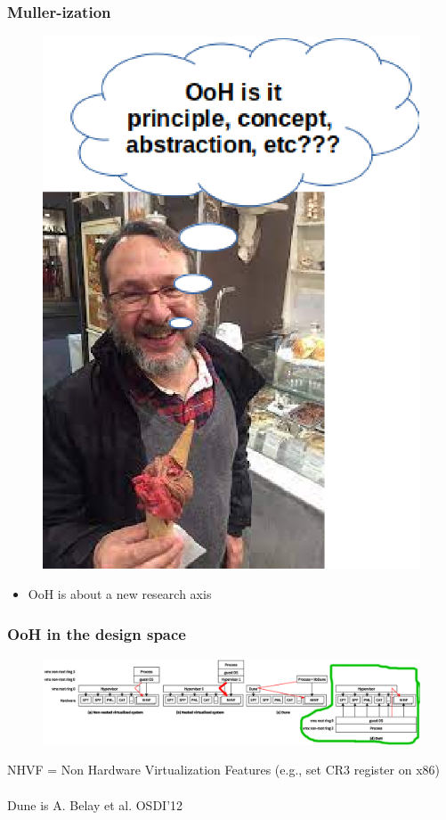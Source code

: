 \documentclass[xcolor=table,bigger,unknownkeysallowed]{beamer}
\begin{document}
        \begin{frame}
        \frametitle{Muller-ization} 
 		    \begin{figure}
			\centering
	\includegraphics[width=.2\columnwidth]{fig/mullerization}
			\end{figure}         
				\begin{itemize}
					\item \huge OoH is about a new research axis
				\end{itemize}
        \end{frame}               
        \begin{frame}
        \frametitle{OoH in the design space} 
 		    \begin{figure}
			\centering
	\includegraphics[width=1\columnwidth]{fig/differences}
			\end{figure} 
			\scriptsize NHVF = Non Hardware Virtualization Features (e.g., set CR3 register on x86)\\
			~\\
			\scriptsize Dune is A. Belay et al. OSDI'12			
        \end{frame}        
\end{document}
